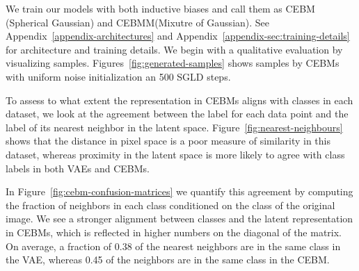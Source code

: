 \documentclass[tablecaption=bottom,wcp]{jmlr} %
\begin{document}

We train our models with both inductive biases and call them as CEBM (Spherical Gaussian) and CEBMM(Mixutre of Gaussian). See Appendix~\ref{appendix-architectures} and Appendix~\ref{appendix-sec:training-details} for architecture and training details. We begin with a qualitative evaluation by visualizing samples. Figures~\ref{fig:generated-samples} shows samples by CEBMs with uniform noise initialization an 500 SGLD steps. 


To assess to what extent the representation in CEBMs aligns with classes in each dataset, we look at the agreement between the label for each data point and the label of its nearest neighbor in the latent space. Figure~\ref{fig:nearest-neighbours} shows that the distance in pixel space is a poor measure of similarity in this dataset, whereas proximity in the latent space is more likely to agree with class labels in both VAEs and CEBMs. 

In Figure~\ref{fig:cebm-confusion-matrices} we quantify this agreement by computing the fraction of neighbors in each class conditioned on the class of the original image. We see a stronger alignment between classes and the latent representation in CEBMs, which is reflected in higher numbers on the diagonal of the matrix. On average, a fraction of 0.38 of the nearest neighbors are in the same class in the VAE, whereas 0.45 of the neighbors are in the same class in the CEBM. 
\end{document}
